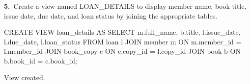 \noindent\begin{minipage}{\linewidth}
\begingroup{}
{\fontsize{14}{17}\selectfont\textbf{5.}}\ Create a view named LOAN\_DETAILS to display member name, book title, issue date, due date, and loan status by joining the appropriate tables.\par
\endgroup\vspace{12pt}


\begin{sqlcode}
CREATE VIEW loan_details AS
SELECT m.full_name, b.title, l.issue_date, l.due_date, l.loan_status
FROM loan l
JOIN member m ON m.member_id = l.member_id
JOIN book_copy c ON c.copy_id = l.copy_id
JOIN book b ON b.book_id = c.book_id;
\end{sqlcode}

\vspace{18pt}


\begin{sqlout}[fontsize=\small]
View created.
\end{sqlout}
\end{minipage}\par\vspace{24pt}


